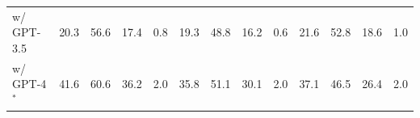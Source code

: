 \begin{table}[t]
{\begin{tabular}{lcccccccccccc}
     \addlinespace[0.1em]\hdashline\addlinespace[0.1em]
     \hspace{1em}w/ GPT-3.5&\num{20.3}&\num{56.6}&\num{17.4}&\num{0.8}&\num{19.3}&\num{48.8}&\num{16.2}&\num{0.6}&\num{21.6}&\num{52.8}&\num{18.6}&\num{1.0} \\
     \hspace{1em}w/ GPT-4$^*$&\num{41.6}&\num{60.6}&\num{36.2}&\num{2.0}&\num{35.8}&\num{51.1}&\num{30.1}&\num{2.0}&\num{37.1}&\num{46.5}&\num{26.4}&\num{2.0} \\
\bottomrule
\end{tabular}}
\label{tab:main}
\end{table}
